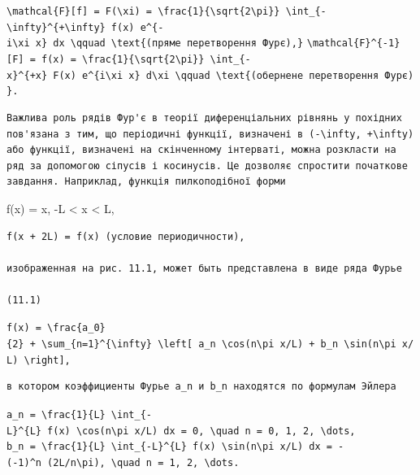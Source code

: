 \documentclass[
  ukrainian,
]{article}
\begin{document}
\texttt{\textbackslash{}mathcal\{F\}{[}f{]}\ =\ F(\textbackslash{}xi)\ =\ \textbackslash{}frac\{1\}\{\textbackslash{}sqrt\{2\textbackslash{}pi\}\}\ \textbackslash{}int\_\{-\textbackslash{}infty\}\^{}\{+\textbackslash{}infty\}\ f(x)\ e\^{}\{-i\textbackslash{}xi\ x\}\ dx\ \textbackslash{}qquad\ \textbackslash{}text\{(пряме\ перетворення\ Фур\textquotesingle{}є),\}}
\texttt{\textbackslash{}mathcal\{F\}\^{}\{-1\}{[}F{]}\ =\ f(x)\ =\ \textbackslash{}frac\{1\}\{\textbackslash{}sqrt\{2\textbackslash{}pi\}\}\ \textbackslash{}int\_\{-x\}\^{}\{+x\}\ F(x)\ e\^{}\{i\textbackslash{}xi\ x\}\ d\textbackslash{}xi\ \textbackslash{}qquad\ \textbackslash{}text\{(обернене\ перетворення\ Фур\textquotesingle{}є)\}.}

\begin{verbatim}
Важлива роль рядів Фур'є в теорії диференціальних рівнянь у похідних пов'язана з тим, що періодичні функції, визначені в (-\infty, +\infty) або функції, визначені на скінченному інтерваті, можна розкласти на ряд за допомогою сіпусів і косинусів. Це дозволяє спростити початкове завдання. Наприклад, функція пилкоподібної форми
\end{verbatim}

f(x) = x, -L \textless{} x \textless{} L,

\begin{verbatim}
f(x + 2L) = f(x) (условие периодичности),

изображенная на рис. 11.1, может быть представлена в виде ряда Фурье

(11.1)
\end{verbatim}

\texttt{f(x)\ =\ \textbackslash{}frac\{a\_0\}\{2\}\ +\ \textbackslash{}sum\_\{n=1\}\^{}\{\textbackslash{}infty\}\ \textbackslash{}left{[}\ a\_n\ \textbackslash{}cos(n\textbackslash{}pi\ x/L)\ +\ b\_n\ \textbackslash{}sin(n\textbackslash{}pi\ x/L)\ \textbackslash{}right{]},}

\begin{verbatim}
в котором коэффициенты Фурье a_n и b_n находятся по формулам Эйлера
\end{verbatim}

\texttt{a\_n\ =\ \textbackslash{}frac\{1\}\{L\}\ \textbackslash{}int\_\{-L\}\^{}\{L\}\ f(x)\ \textbackslash{}cos(n\textbackslash{}pi\ x/L)\ dx\ =\ 0,\ \textbackslash{}quad\ n\ =\ 0,\ 1,\ 2,\ \textbackslash{}dots,}
\texttt{b\_n\ =\ \textbackslash{}frac\{1\}\{L\}\ \textbackslash{}int\_\{-L\}\^{}\{L\}\ f(x)\ \textbackslash{}sin(n\textbackslash{}pi\ x/L)\ dx\ =\ -(-1)\^{}n\ (2L/n\textbackslash{}pi),\ \textbackslash{}quad\ n\ =\ 1,\ 2,\ \textbackslash{}dots.}
\end{document}
